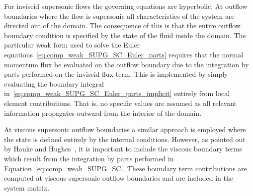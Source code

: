 For inviscid supersonic flows the governing equations are hyperbolic.  At outflow boundaries where the flow is supersonic all characteristics of the system are directed out of the domain.  The consequence of this is that the entire outflow boundary condition is specified by the state of the fluid inside the domain.  The particular weak form used to solve the Euler equations~\eqref{eq:comp_weak_SUPG_SC_Euler_parts} requires that the normal momentum flux be evaluated on the outflow boundary due to the integration by parts performed on the inviscid flux term.  This is implemented by simply evaluating the boundary integral in~\eqref{eq:comp_weak_SUPG_SC_Euler_parts_implicit} entirely from local element contributions.  That is, no specific values are assumed as all relevant information propagates outward from the interior of the domain.


At viscous supersonic outflow boundaries a similar approach is employed where the state is defined entirely by the internal conditions.  However, as pointed out by Hauke and Hughes~\cite{hauke_hughes_compressible_variables}, it is important to include the viscous boundary terms which result from the integration by parts performed in Equation~\eqref{eq:comp_weak_SUPG_SC}.  These boundary term contributions are computed at viscous supersonic outflow boundaries and are included in the system matrix.







